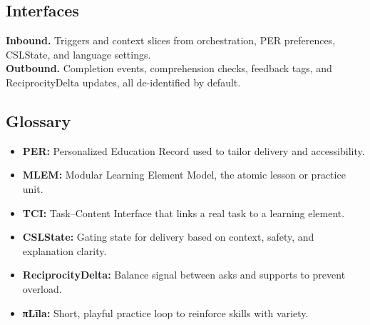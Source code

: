 \documentclass[12pt]{article}
\begin{document}
\subsection*{Interfaces}
\textbf{Inbound.} Triggers and context slices from orchestration, PER preferences, CSLState, and language settings. \\
\textbf{Outbound.} Completion events, comprehension checks, feedback tags, and ReciprocityDelta updates, all de-identified by default.

\subsection*{Glossary}
\begin{itemize}[leftmargin=*]
  \item \textbf{PER:} Personalized Education Record used to tailor delivery and accessibility.
  \item \textbf{MLEM:} Modular Learning Element Model, the atomic lesson or practice unit.
  \item \textbf{TCI:} Task–Content Interface that links a real task to a learning element.
  \item \textbf{CSLState:} Gating state for delivery based on context, safety, and explanation clarity.
  \item \textbf{ReciprocityDelta:} Balance signal between asks and supports to prevent overload.
  \item \textbf{πLīla:} Short, playful practice loop to reinforce skills with variety.
\end{itemize}
\end{document}
